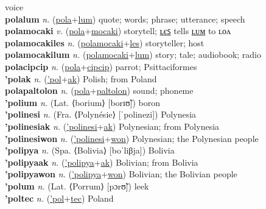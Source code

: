 voice \label{polaluat} \\
\textbf{polalum} \textit{n.} (\hyperref[pola]{pola}+\hyperref[lum]{lum})
quote; words; phrase; utterance; speech \label{polalum} \\
\textbf{polamocaki} \textit{v.} (\hyperref[pola]{pola}+\hyperref[mocaki]{mocaki})
storytell; \hyperref[polamocakiles]{ʟєꜱ} tells \hyperref[polamocakilum]{ʟᴜᴍ} to ʟᴏᴧ \label{polamocaki} \\
\textbf{polamocakiles} \textit{n.} (\hyperref[polamocaki]{polamocaki}+\hyperref[les]{les})
storyteller; host \label{polamocakiles} \\
\textbf{polamocakilum} \textit{n.} (\hyperref[polamocaki]{polamocaki}+\hyperref[lum]{lum})
story; tale; audiobook; radio \label{polamocakilum} \\
\textbf{polacipcip} \textit{n.} (\hyperref[pola]{pola}+\hyperref[cipcip]{cipcip})
parrot; Psittaciformes \label{polacipcip} \\
\textbf{'polak} \textit{n.} (\hyperref['pol]{'pol}+\hyperref[ak]{ak})
Polish; from Poland \label{'polak} \\
\textbf{polapaltolon} \textit{n.} (\hyperref[pola]{pola}+\hyperref[paltolon]{paltolon})
sound; phoneme \label{polapaltolon} \\
\textbf{'polium} \textit{n.} (Lat. ⟨borium⟩ [borɪʊ̃])
boron \label{'polium} \\
\textbf{'polinesi} \textit{n.} (Fra. ⟨Polynésie⟩ [ˈpolinezi])
Polynesia \label{'polinesi} \\
\textbf{'polinesiak} \textit{n.} (\hyperref['polinesi]{'polinesi}+\hyperref[ak]{ak})
Polynesian; from Polynesia \label{'polinesiak} \\
\textbf{'polinesiwon} \textit{n.} (\hyperref['polinesi]{'polinesi}+\hyperref[won]{won})
Polynesian; the Polynesian people \label{'polinesiwon} \\
\textbf{'polipya} \textit{n.} (Spa. ⟨Bolivia⟩ [boˈliβja])
Bolivia \label{'polipya} \\
\textbf{'polipyaak} \textit{n.} (\hyperref['polipya]{'polipya}+\hyperref[ak]{ak})
Bolivian; from Bolivia \label{'polipyaak} \\
\textbf{'polipyawon} \textit{n.} (\hyperref['polipya]{'polipya}+\hyperref[won]{won})
Bolivian; the Bolivian people \label{'polipyawon} \\
\textbf{'polum} \textit{n.} (Lat. ⟨Porrum⟩ [pɔrʊ̃])
leek \label{'polum} \\
\textbf{'poltec} \textit{n.} (\hyperref['pol]{'pol}+\hyperref[tec]{tec})
Poland \label{'poltec} \\

